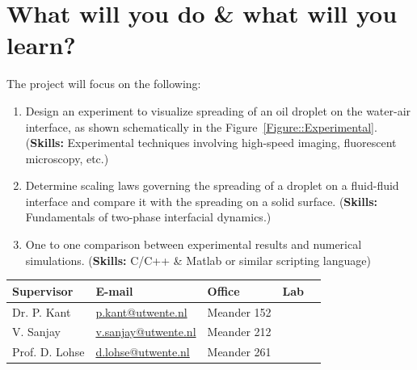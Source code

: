 \documentclass[a4paper,10pt]{article}
\begin{document}
\section*{What will you do \& what will you learn?}
The project will focus on the following:
\begin{enumerate}
\item Design an experiment to visualize spreading of an oil droplet on the water-air interface, as shown schematically in the Figure~\ref{Figure::Experimental}. (\textbf{Skills:} Experimental techniques involving high-speed imaging, fluorescent microscopy, etc.)
\item Determine scaling laws governing the spreading of a droplet on a fluid-fluid interface and compare it with the spreading on a solid surface. (\textbf{Skills:} Fundamentals of two-phase interfacial dynamics.)
\item One to one comparison between experimental results and numerical simulations. (\textbf{Skills:} C/C++ \& Matlab or similar scripting language)
\end{enumerate}
\begin{center}
\begin{tabular}{|l|l|l|l|l|}
\hline \textbf{Supervisor} & \textbf{E-mail} & \textbf{Office} &\textbf{Lab} \\
\hline Dr. P. Kant   & \href{mailto:p.kant@utwente.nl}{p.kant@utwente.nl} & Meander 152 & \\
\hline V. Sanjay & \href{mailto:v.sanjay@utwente.nl}{v.sanjay@utwente.nl} & Meander 212 &\\
\hline Prof. D. Lohse & \href{mailto:d.lohse@utwente.nl}{d.lohse@utwente.nl} & Meander 261  &\\
\hline
\end{tabular}
\end{center}
\printbibliography
\end{document}

